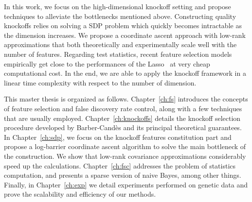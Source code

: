 In this work, we focus on the high-dimensional knockoff setting and propose techniques
to alleviate the bottlenecks mentioned above.
Constructing quality knockoffs relies on solving a SDP problem
which quickly becomes intractable as the dimension increases.
We propose a coordinate ascent approach with low-rank approximations
that both theoretically and experimentally scale well with the number of features.
Regarding test statistics, recent feature selection models~\citep{sparse_naive_bayes, sparse_center_classifiers}
empirically get close to the performances of the Lasso~\citep{lasso} at very cheap computational cost.
In the end, we are able to apply the knockoff framework
in a linear time complexity with respect to the number of dimension.

This master thesis is organized as follows.
Chapter~\ref{ch:fs} introduces the concepts of feature selection and
false discovery rate control, along with a few techniques that are usually employed.
Chapter~\ref{ch:knockoffs} details the knockoff selection procedure developed by Barber-Candès
and its principal theoretical guarantees.
In Chapter~\ref{ch:sdp},
we focus on the knockoff features constitution part
and propose a log-barrier coordinate ascent algorithm to solve the main bottleneck of the construction.
We show that low-rank covariance approximations considerably speed up the calculations.
Chapter~\ref{ch:fsc} addresses the problem of statistics computation,
and presents a sparse version of naive Bayes, among other things.
Finally, in Chapter~\ref{ch:exp} we detail experiments performed on genetic data and prove the scalability
and efficiency of our methods.

